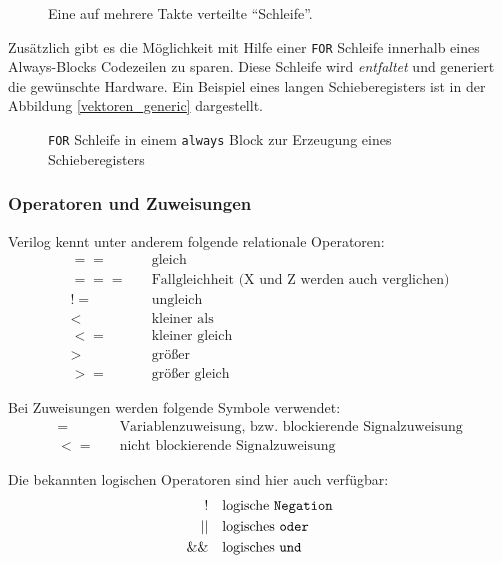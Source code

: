 \begin{figure}[h]
	\lstset{style=verilog-style}
	
	\caption{Eine auf mehrere Takte verteilte ``Schleife''.} \label{bspalwloop}
\end{figure}
Zusätzlich gibt es die Möglichkeit mit Hilfe einer \texttt{FOR} Schleife innerhalb eines Always-Blocks Codezeilen zu sparen. Diese Schleife wird \emph{entfaltet} und generiert die gewünschte Hardware. Ein Beispiel eines langen Schieberegisters ist in der Abbildung \ref{vektoren_generic} dargestellt.
\begin{figure}[H]
	\lstset{style=verilog-style}
	
	\caption{\texttt{FOR} Schleife in einem \texttt{always} Block zur Erzeugung eines Schieberegisters} \label{bspforloop_always}
\end{figure}
\subsubsection*{Operatoren und Zuweisungen}

Verilog kennt unter anderem folgende relationale Operatoren:
\begin{align*}
==& \quad \text{gleich} \\
===& \quad \text{Fallgleichheit (X und Z werden auch verglichen)}\\
!=& \quad \text{ungleich} \\
<& \quad \text{kleiner als} \\
<=& \quad \text{kleiner gleich} \\
>& \quad \text{größer} \\
>=& \quad \text{größer gleich} 
\end{align*}

Bei Zuweisungen werden folgende Symbole verwendet:
\begin{align*}
=& \quad \text{Variablenzuweisung, bzw. blockierende Signalzuweisung} \\
<=& \quad \text{nicht blockierende Signalzuweisung} 
\end{align*}

Die bekannten logischen Operatoren sind hier auch verfügbar:
\begin{align*}
!& \quad \text{logische \texttt{Negation}} \\
||& \quad \text{logisches \texttt{oder}} \\
\&\&& \quad \text{logisches \texttt{und}}
\end{align*}

